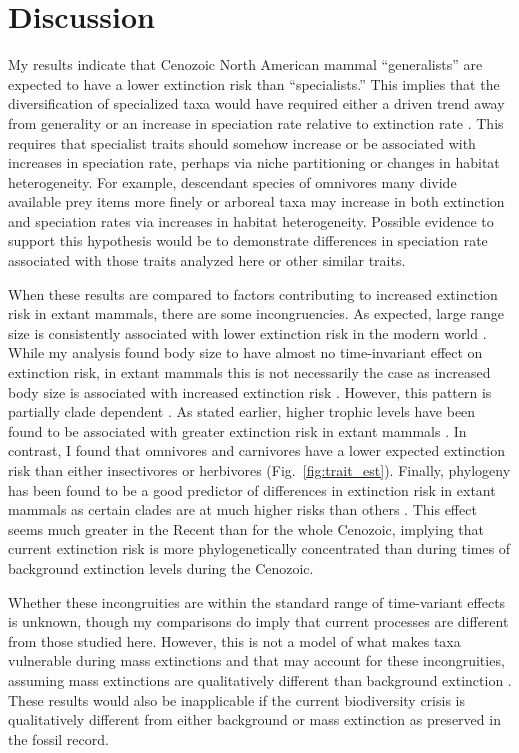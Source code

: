 \section{Discussion}
My results indicate that Cenozoic North American mammal ``generalists'' are expected to have a lower extinction risk than ``specialists.'' This implies that the diversification of specialized taxa would have required either a driven trend away from generality \cite{McShea1994a} or an increase in speciation rate relative to extinction rate \cite{Stanley1975}. This requires that specialist traits should somehow increase or be associated with increases in speciation rate, perhaps via niche partitioning or changes in habitat heterogeneity. For example, descendant species of omnivores many divide available prey items more finely or arboreal taxa may increase in both extinction and speciation rates via increases in habitat heterogeneity. Possible evidence to support this hypothesis would be to demonstrate differences in speciation rate associated with those traits analyzed here or other similar traits.

When these results are compared to factors contributing to increased extinction risk in extant mammals, there are some incongruencies. As expected, large range size is consistently associated with lower extinction risk in the modern world \cite{Liow2009,Purvis2000a,Fritz2009,Fritz2010b}. While my analysis found body size to have almost no time-invariant effect on extinction risk, in extant mammals this is not necessarily the case as increased body size is associated with increased extinction risk \cite{Liow2009,Purvis2000a}. However, this pattern is partially clade dependent \cite{Fritz2009}. As stated earlier, higher trophic levels have been found to be associated with greater extinction risk in extant mammals \cite{Liow2009,Purvis2000a}. In contrast, I found that omnivores and carnivores have a lower expected extinction risk than either insectivores or herbivores (Fig.~\ref{fig:trait_est}). Finally, phylogeny has been found to be a good predictor of differences in extinction risk in extant mammals as certain clades are at much higher risks than others \cite{Fritz2010b}. This effect seems much greater in the Recent than for the whole Cenozoic, implying that current extinction risk is more phylogenetically concentrated than during times of background extinction levels during the Cenozoic.

Whether these incongruities are within the standard range of time-variant effects is unknown, though my comparisons do imply that current processes are different from those studied here. However, this is not a model of what makes taxa vulnerable during mass extinctions and that may account for these incongruities, assuming mass extinctions are qualitatively different than background extinction \cite{Jablonski1986}. These results would also be inapplicable if the current biodiversity crisis is qualitatively different from either background or mass extinction as preserved in the fossil record.

